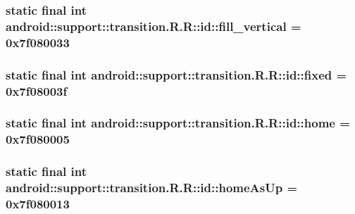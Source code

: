 \hypertarget{classandroid_1_1support_1_1transition_1_1_r_1_1id_c45fcd286e362364f77a5725cf66f0c0}{
\subsubsection[{fill\_\-vertical}]{\setlength{\rightskip}{0pt plus 5cm}static final int android::support::transition.R.R::id::fill\_\-vertical = 0x7f080033}}
\label{classandroid_1_1support_1_1transition_1_1_r_1_1id_c45fcd286e362364f77a5725cf66f0c0}


\hypertarget{classandroid_1_1support_1_1transition_1_1_r_1_1id_e1bde221617837c94239c7536c33cb44}{
\subsubsection[{fixed}]{\setlength{\rightskip}{0pt plus 5cm}static final int android::support::transition.R.R::id::fixed = 0x7f08003f}}
\label{classandroid_1_1support_1_1transition_1_1_r_1_1id_e1bde221617837c94239c7536c33cb44}


\hypertarget{classandroid_1_1support_1_1transition_1_1_r_1_1id_fb83f59429a2ba2120ae3c27dc393d3a}{
\subsubsection[{home}]{\setlength{\rightskip}{0pt plus 5cm}static final int android::support::transition.R.R::id::home = 0x7f080005}}
\label{classandroid_1_1support_1_1transition_1_1_r_1_1id_fb83f59429a2ba2120ae3c27dc393d3a}


\hypertarget{classandroid_1_1support_1_1transition_1_1_r_1_1id_8b8307438f4d62088608962dee6dcff1}{
\subsubsection[{homeAsUp}]{\setlength{\rightskip}{0pt plus 5cm}static final int android::support::transition.R.R::id::homeAsUp = 0x7f080013}}
\label{classandroid_1_1support_1_1transition_1_1_r_1_1id_8b8307438f4d62088608962dee6dcff1}


